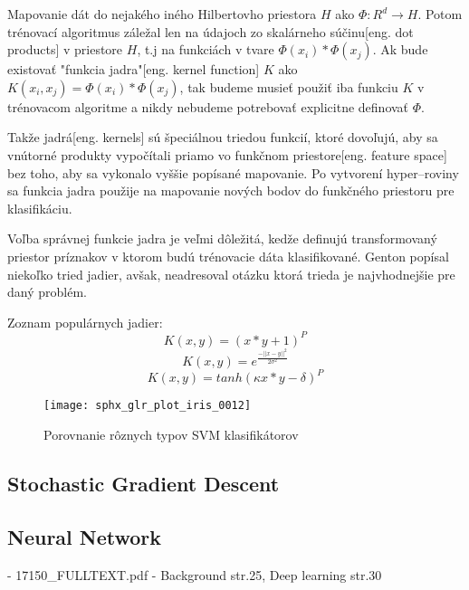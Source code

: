 Mapovanie dát do nejakého iného Hilbertovho priestora \cite{prop:HilbertSpace} $H$ ako $\Phi:R^d \rightarrow H$.
Potom trénovací algoritmus záležal len na údajoch zo skalárneho súčinu[eng. dot products] v priestore $H$, t.j na funkciách v tvare $\Phi(x_i) * \Phi(x_j)$.
Ak bude existovať "funkcia jadra"[eng. kernel function] $K$ ako $K(x_i, x_j) = \Phi(x_i)*\Phi(x_j)$, tak budeme musieť použiť iba funkciu $K$ v trénovacom algoritme
    a nikdy nebudeme potrebovať explicitne definovať $\Phi$\cite{prop:SupervisedMachineLearning}.

Takže jadrá[eng. kernels] sú špeciálnou triedou funkcií, ktoré dovoľujú, aby sa vnútorné produkty vypočítali priamo vo funkčnom priestore[eng. feature space] bez toho, aby sa vykonalo vyššie popísané mapovanie.
Po vytvorení hyper--roviny sa funkcia jadra použije na mapovanie nových bodov do funkčného priestoru pre klasifikáciu\cite{prop:SupervisedMachineLearning}.

Voľba správnej funkcie jadra je veľmi dôležitá, kedže definujú transformovaný priestor príznakov v ktorom budú trénovacie dáta klasifikované.
Genton \cite{prop:KernelClasses} popísal niekoľko tried jadier, avšak, neadresoval otázku ktorá trieda je najvhodnejšie pre daný problém.

Zoznam populárnych jadier\cite{prop:SupervisedMachineLearning}:
\begin{equation}
    K(x, y) = (x*y+1)^P
\end{equation}
\begin{equation}
    K(x, y) = e^{\frac{-||x-y||^2}{2 \sigma^2}}
\end{equation}
\begin{equation}
    K(x, y) = tanh(\kappa x*y - \delta)^P
\end{equation}

\begin{figure}[H]
	\centering
	\texttt{[image: sphx\_glr\_plot\_iris\_0012]}
	\caption{Porovnanie rôznych typov SVM klasifikátorov\cite{odkaz:SVMImage}}
	\label{pic:SVMComparison}
\end{figure}

\subsection{Stochastic Gradient Descent}

\subsection{Neural Network}
- 17150\_FULLTEXT.pdf - Background str.25, Deep learning str.30

